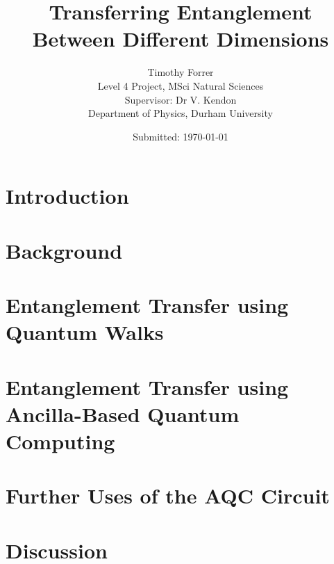 \documentclass[12pt, onecolumn]{article}
\begin{document}
\title{\bf{Transferring Entanglement Between Different Dimensions}} 
\date{Submitted: \today{}}
\author{
    Timothy Forrer\\
    Level 4 Project, MSci Natural Sciences\\
    Supervisor: Dr V. Kendon\\
    Department of Physics, Durham University}

\maketitle



\newpage

\tableofcontents

\newpage

\section{Introduction}
\label{section:intro}


\section{Background}
\label{section:background}

\label{subsection:qc_primer}

\label{subsection:entangle}

\label{subsection:qw}

\label{subsection:aqc}

\section{Entanglement Transfer using Quantum Walks}
\label{section:qw_transfer}


\section{Entanglement Transfer using Ancilla-Based Quantum Computing}
\label{section:aqc_transfer}


\section{Further Uses of the AQC Circuit}
\label{section:furtheruses}


\section{Discussion}
\label{section:discussion}




\printbibliography[heading=bibintoc]

\newpage


\end{document}
